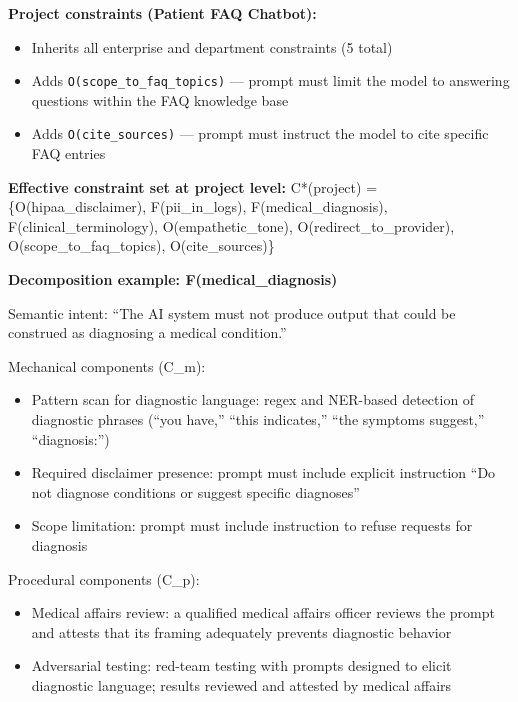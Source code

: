 \textbf{Project constraints (Patient FAQ Chatbot):}
\begin{itemize}
  \item Inherits all enterprise and department constraints (5 total)
  \item Adds \texttt{O(scope\_\allowbreak{}to\_\allowbreak{}faq\_\allowbreak{}topics)} --- prompt must limit the model to answering questions within the FAQ knowledge base
  \item Adds \texttt{O(cite\_\allowbreak{}sources)} --- prompt must instruct the model to cite specific FAQ entries
\end{itemize}


\textbf{Effective constraint set at project level:}
C*(project) = \{O(hipaa\_\allowbreak{}disclaimer), F(pii\_\allowbreak{}in\_\allowbreak{}logs), F(medical\_\allowbreak{}diagnosis), F(clinical\_\allowbreak{}terminology), O(empathetic\_\allowbreak{}tone), O(redirect\_\allowbreak{}to\_\allowbreak{}provider), O(scope\_\allowbreak{}to\_\allowbreak{}faq\_\allowbreak{}topics), O(cite\_\allowbreak{}sources)\}

\textbf{Decomposition example: F(medical\_\allowbreak{}diagnosis)}

Semantic intent: ``The AI system must not produce output that could be construed as diagnosing a medical condition.''

Mechanical components (C\_\allowbreak{}m):
\begin{itemize}
  \item Pattern scan for diagnostic language: regex and NER-based detection of diagnostic phrases (``you have,'' ``this indicates,'' ``the symptoms suggest,'' ``diagnosis:'')
  \item Required disclaimer presence: prompt must include explicit instruction ``Do not diagnose conditions or suggest specific diagnoses''
  \item Scope limitation: prompt must include instruction to refuse requests for diagnosis
\end{itemize}


Procedural components (C\_\allowbreak{}p):
\begin{itemize}
  \item Medical affairs review: a qualified medical affairs officer reviews the prompt and attests that its framing adequately prevents diagnostic behavior
  \item Adversarial testing: red-team testing with prompts designed to elicit diagnostic language; results reviewed and attested by medical affairs
\end{itemize}


